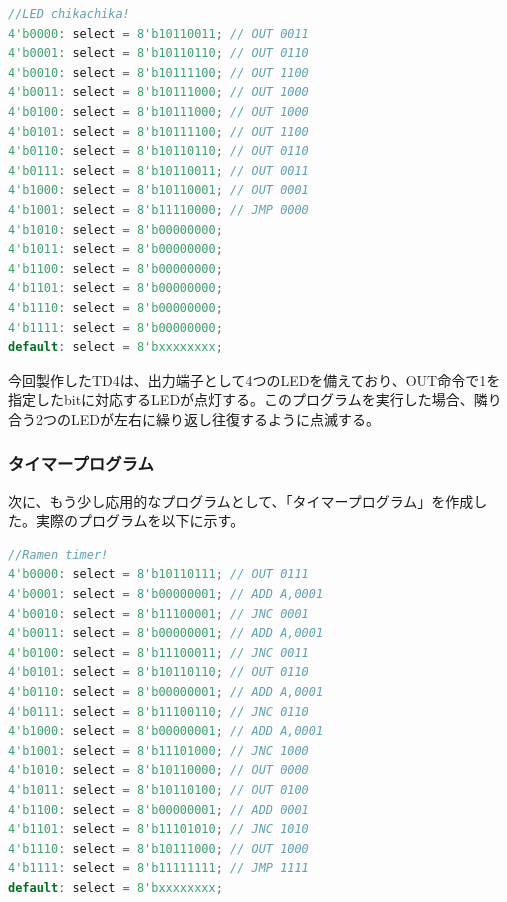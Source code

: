 \documentclass[dvipdfmx,a4j, titlepage]{jsarticle}
\begin{document}
\begin{lstlisting}[language=Verilog, label={led_chikachika}, title={図\thefigure　LEDを決まったパターンで点滅させるプログラム}]
//LED chikachika!
4'b0000: select = 8'b10110011; // OUT 0011
4'b0001: select = 8'b10110110; // OUT 0110
4'b0010: select = 8'b10111100; // OUT 1100
4'b0011: select = 8'b10111000; // OUT 1000
4'b0100: select = 8'b10111000; // OUT 1000
4'b0101: select = 8'b10111100; // OUT 1100
4'b0110: select = 8'b10110110; // OUT 0110
4'b0111: select = 8'b10110011; // OUT 0011
4'b1000: select = 8'b10110001; // OUT 0001
4'b1001: select = 8'b11110000; // JMP 0000
4'b1010: select = 8'b00000000;
4'b1011: select = 8'b00000000;
4'b1100: select = 8'b00000000;
4'b1101: select = 8'b00000000;
4'b1110: select = 8'b00000000;
4'b1111: select = 8'b00000000;
default: select = 8'bxxxxxxxx;
\end{lstlisting}

今回製作したTD4は、出力端子として4つのLEDを備えており、OUT命令で1を指定したbitに対応するLEDが点灯する。このプログラムを実行した場合、隣り合う2つのLEDが左右に繰り返し往復するように点滅する。\\

\subsubsection{タイマープログラム}
次に、もう少し応用的なプログラムとして、「タイマープログラム」を作成した。実際のプログラムを以下に示す。\\

\begin{lstlisting}[language=Verilog, label={ramen_timer}, title={図\thefigure　タイマープログラム}]
//Ramen timer!
4'b0000: select = 8'b10110111; // OUT 0111
4'b0001: select = 8'b00000001; // ADD A,0001
4'b0010: select = 8'b11100001; // JNC 0001
4'b0011: select = 8'b00000001; // ADD A,0001
4'b0100: select = 8'b11100011; // JNC 0011
4'b0101: select = 8'b10110110; // OUT 0110
4'b0110: select = 8'b00000001; // ADD A,0001
4'b0111: select = 8'b11100110; // JNC 0110
4'b1000: select = 8'b00000001; // ADD A,0001
4'b1001: select = 8'b11101000; // JNC 1000
4'b1010: select = 8'b10110000; // OUT 0000
4'b1011: select = 8'b10110100; // OUT 0100
4'b1100: select = 8'b00000001; // ADD 0001
4'b1101: select = 8'b11101010; // JNC 1010
4'b1110: select = 8'b10111000; // OUT 1000
4'b1111: select = 8'b11111111; // JMP 1111
default: select = 8'bxxxxxxxx;
\end{lstlisting}
\end{document}
